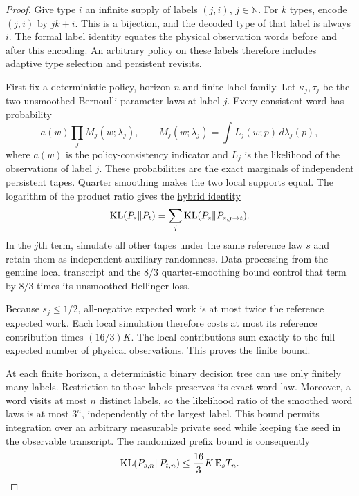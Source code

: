\begin{proof}
Give type $i$ an infinite supply of labels $(j,i)$, $j\in\mathbb N$.
For $k$ types, encode $(j,i)$ by $jk+i$. This is a bijection, and the
decoded type of that label is always $i$. The formal
\href{https://github.com/davidiach/adaptive-threshold-estimation/blob/1f6a773aa1176a35cd83930d4d37b7251439c03e/lean/ThresholdHC/TypedConfidence/Labels.lean}{label identity}
equates the physical observation words before and after this encoding.
An arbitrary policy on these labels therefore includes adaptive type
selection and persistent revisits.

First fix a deterministic policy, horizon $n$ and finite label family.
Let $\kappa_j,\tau_j$ be the two unsmoothed Bernoulli parameter laws at
label $j$. Every consistent word has probability
\[
 a(w)\prod_j M_j(w;\lambda_j),
 \qquad
 M_j(w;\lambda_j)=\int L_j(w;p)\,d\lambda_j(p),
\]
where $a(w)$ is the policy-consistency indicator and $L_j$ is the
likelihood of the observations of label $j$. These probabilities are
the exact marginals of independent persistent tapes. Quarter
smoothing makes the two local supports equal. The logarithm of the
product ratio gives the
\href{https://github.com/davidiach/adaptive-threshold-estimation/blob/1f6a773aa1176a35cd83930d4d37b7251439c03e/lean/ThresholdHC/TypedConfidence/ParameterHybrid.lean}{hybrid identity}
\[
 \operatorname{KL}(P_s\Vert P_t)=\sum_j\operatorname{KL}(P_s\Vert P_{s,j\to t}).
\]
In the $j$th term, simulate all other tapes under the same reference
law $s$ and retain them as independent auxiliary randomness.
Data processing from the genuine local transcript and the $8/3$
quarter-smoothing bound control that term by $8/3$ times its
unsmoothed Hellinger loss.

Because $s_j\le1/2$, all-negative expected work is at most twice
the reference expected work. Each local simulation therefore costs
at most its reference contribution times $(16/3)K$.
The local contributions sum exactly to the full expected number of
physical observations. This proves the finite bound.

\clearpage
At each finite horizon, a deterministic binary decision tree can use
only finitely many labels. Restriction to those labels preserves its
exact word law. Moreover, a word visits at most $n$ distinct labels,
so the likelihood ratio of the smoothed word laws is at most $3^n$,
independently of the largest label. This bound permits integration
over an arbitrary measurable private seed while keeping the seed
in the observable transcript. The
\href{https://github.com/davidiach/adaptive-threshold-estimation/blob/1f6a773aa1176a35cd83930d4d37b7251439c03e/lean/ThresholdHC/TypedConfidence/SeededTransfer.lean}{randomized prefix bound}
is consequently
\[
 \operatorname{KL}(P_{s,n}\Vert P_{t,n})\le
 \frac{16}{3}K\,\mathbb E_s T_n.
\]


\end{proof}
